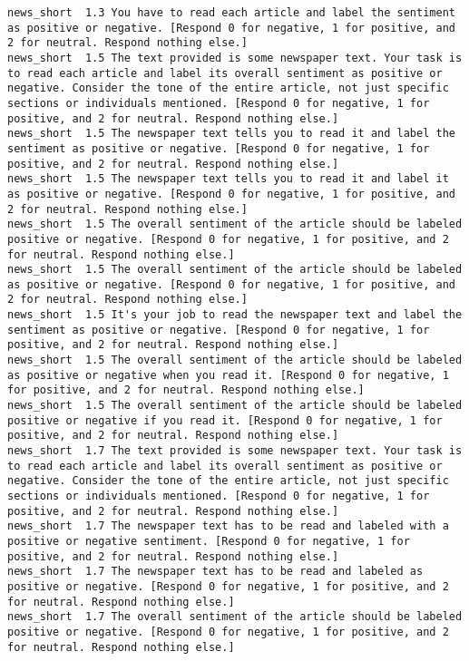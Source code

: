 \begin{lstlisting}[label=lst:promptvariants]
news_short	1.3	You have to read each article and label the sentiment as positive or negative. [Respond 0 for negative, 1 for positive, and 2 for neutral. Respond nothing else.]
news_short	1.5	The text provided is some newspaper text. Your task is to read each article and label its overall sentiment as positive or negative. Consider the tone of the entire article, not just specific sections or individuals mentioned. [Respond 0 for negative, 1 for positive, and 2 for neutral. Respond nothing else.]
news_short	1.5	The newspaper text tells you to read it and label the sentiment as positive or negative. [Respond 0 for negative, 1 for positive, and 2 for neutral. Respond nothing else.]
news_short	1.5	The newspaper text tells you to read it and label it as positive or negative. [Respond 0 for negative, 1 for positive, and 2 for neutral. Respond nothing else.]
news_short	1.5	The overall sentiment of the article should be labeled positive or negative. [Respond 0 for negative, 1 for positive, and 2 for neutral. Respond nothing else.]
news_short	1.5	The overall sentiment of the article should be labeled as positive or negative. [Respond 0 for negative, 1 for positive, and 2 for neutral. Respond nothing else.]
news_short	1.5	It's your job to read the newspaper text and label the sentiment as positive or negative. [Respond 0 for negative, 1 for positive, and 2 for neutral. Respond nothing else.]
news_short	1.5	The overall sentiment of the article should be labeled as positive or negative when you read it. [Respond 0 for negative, 1 for positive, and 2 for neutral. Respond nothing else.]
news_short	1.5	The overall sentiment of the article should be labeled positive or negative if you read it. [Respond 0 for negative, 1 for positive, and 2 for neutral. Respond nothing else.]
news_short	1.7	The text provided is some newspaper text. Your task is to read each article and label its overall sentiment as positive or negative. Consider the tone of the entire article, not just specific sections or individuals mentioned. [Respond 0 for negative, 1 for positive, and 2 for neutral. Respond nothing else.]
news_short	1.7	The newspaper text has to be read and labeled with a positive or negative sentiment. [Respond 0 for negative, 1 for positive, and 2 for neutral. Respond nothing else.]
news_short	1.7	The newspaper text has to be read and labeled as positive or negative. [Respond 0 for negative, 1 for positive, and 2 for neutral. Respond nothing else.]
news_short	1.7	The overall sentiment of the article should be labeled positive or negative. [Respond 0 for negative, 1 for positive, and 2 for neutral. Respond nothing else.]

\end{lstlisting}
